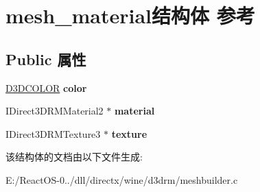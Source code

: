 \hypertarget{structmesh__material}{}\section{mesh\+\_\+material结构体 参考}
\label{structmesh__material}
\subsection*{Public 属性}
\begin{DoxyCompactItemize}
\item 
\mbox{\label{structmesh__material_aa0df176201f3e0bf8a57b1a3501451d6}} 
\hyperlink{struct_d3_d_c_o_l_o_r}{D3\+D\+C\+O\+L\+OR} {\bfseries color}
\item 
\mbox{\label{structmesh__material_aec9ced95f44b3ffed5026e454c8009d2}} 
I\+Direct3\+D\+R\+M\+Material2 $\ast$ {\bfseries material}
\item 
\mbox{\label{structmesh__material_a695a6b03be4f0155c7864111311c8bd1}} 
I\+Direct3\+D\+R\+M\+Texture3 $\ast$ {\bfseries texture}
\end{DoxyCompactItemize}


该结构体的文档由以下文件生成\+:\begin{DoxyCompactItemize}
\item 
E\+:/\+React\+O\+S-\/0../dll/directx/wine/d3drm/meshbuilder.\+c\end{DoxyCompactItemize}
